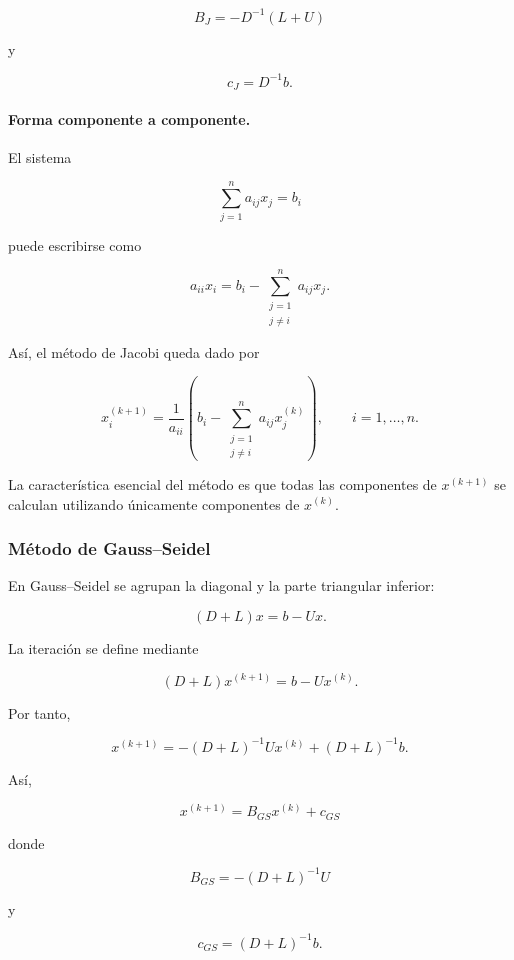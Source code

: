 \documentclass[12pt]{article}
\begin{document}
\[
    \boxed{
    B_J=-D^{-1}(L+U)
    }
\]

y

\[
    \boxed{
    c_J=D^{-1}b.
    }
\]


\paragraph{Forma componente a componente.}

El sistema

\[
    \sum_{j=1}^{n}a_{ij}x_j=b_i
\]

puede escribirse como

\[
    a_{ii}x_i
    =
    b_i-
    \sum_{\substack{j=1\\j\neq i}}^{n}a_{ij}x_j.
\]

Así, el método de Jacobi queda dado por

\[
    \boxed{
    x_i^{(k+1)}
    =
    \frac{1}{a_{ii}}
    \left(
    b_i-
    \sum_{\substack{j=1\\j\neq i}}^{n}
    a_{ij}x_j^{(k)}
    \right),
    \qquad i=1,\ldots,n.
    }
\]

La característica esencial del método es que todas las componentes
de $x^{(k+1)}$ se calculan utilizando únicamente componentes de
$x^{(k)}$.


\subsubsection*{Método de Gauss--Seidel}

En Gauss--Seidel se agrupan la diagonal y la parte triangular inferior:

\[
    (D+L)x=b-Ux.
\]

La iteración se define mediante

\[
    (D+L)x^{(k+1)}
    =
    b-Ux^{(k)}.
\]

Por tanto,

\[
    x^{(k+1)}
    =
    -(D+L)^{-1}Ux^{(k)}
    +
    (D+L)^{-1}b.
\]

Así,

\[
    \boxed{
    x^{(k+1)}
    =
    B_{GS}x^{(k)}+c_{GS}
    }
\]

donde

\[
    \boxed{
    B_{GS}=-(D+L)^{-1}U
    }
\]

y

\[
    \boxed{
    c_{GS}=(D+L)^{-1}b.
    }
\]
\end{document}
